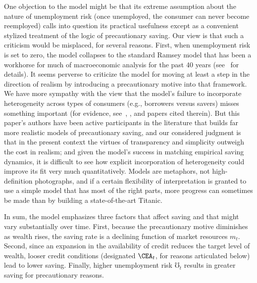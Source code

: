 \documentclass[titlepage]{\econtex}
\begin{document}
\begin{comment}
\hypertarget{}{}
\begin{figure}
\caption{Increase in Unemployment Risk}\label{fig:cBeforeAndAfteruRise}
\texttt{[image: \\econtexRoot/Figures/cBeforeAndAfteruRise]}
\end{figure}
\end{comment}

One objection to the model might be that its extreme assumption about
the nature of unemployment risk (once unemployed, the consumer can
never become reemployed) calls into question its practical usefulness
except as a convenient stylized treatment of the logic of
precautionary saving.  Our view is that such a criticism would be
misplaced, for several reasons.  First, when unemployment risk is set
to zero, the model collapses to the standard Ramsey model that has
been a workhorse for much of macroeconomic analysis for the past 40
years (see~\cite{ctDiscrete} for details).  It seems perverse to
criticize the model for moving at least a step in the direction of
realism by introducing a precautionary motive into that framework.  We
have more sympathy with the view that the model's failure to
incorporate heterogeneity across types of consumers (e.g., borrowers
versus savers) misses something important (for evidence,
see~\cite{dynan_debtOverhang}, \cite{mrsBalance}, and papers cited
therein).  But this paper's authors have been active participants in
the literature that builds far more realistic models of precautionary
saving, and our considered judgment is that in the present context the
virtues of transparency and simplicity outweigh the cost in realism;
and given the model's success in matching empirical saving dynamics,
it is difficult to see how explicit incorporation of heterogeneity
could improve its fit very much quantitatively.  Models are metaphors,
not high-definition photographs, and if a certain flexibility of
interpretation is granted to use a simple model that has most of the
right parts, more progress can sometimes be made than by building a
state-of-the-art Titanic.

In sum, the model emphasizes three factors that affect saving and that might vary substantially over time.  First, because the precautionary motive diminishes as wealth rises, the saving rate is a declining function of market resources $m_{t}$.  Second, since an expansion in the availability of credit reduces the target level of wealth, looser credit conditions (designated $\CEA_t$, for reasons articulated below) lead to lower saving.  Finally, higher unemployment risk $\mho_t$ results in greater saving for precautionary reasons.
\end{document}
